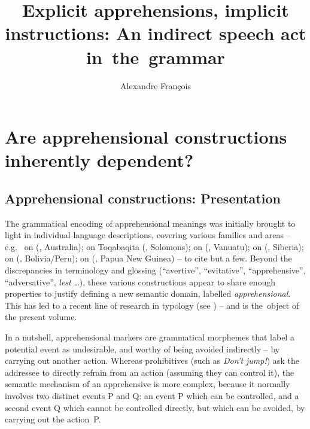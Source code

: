\documentclass[output=paper,colorlinks,citecolor=brown]{langscibook}
\author{Alexandre François\affiliation{LaTTiCe, CNRS‒ENS-PSL, USN\\Australian National University}}
\title{Explicit apprehensions, implicit instructions: An indirect speech act in~the~grammar}
\begin{document}
\maketitle


\section{Are apprehensional constructions inherently dependent?}
\label{sec:1}

\subsection{Apprehensional constructions: Presentation}
\label{subsec:acpresentation}

The grammatical encoding of apprehensional meanings was initially brought to light in individual language descriptions, covering various families and areas -- e.g.\ \citet{Austin1981} on  (, Australia); \citet{lichtenberk1995} on Toqa\-ba\-qita (, Solomons); \citet{francois2003} on  (, Vanuatu); \citet{pakendorfschalley2007} on  (, Siberia); \citet{vuillermet2018a} on  (, Bolivia/Peru); \citet{smithdennis2021} on  (, Papua New Guinea) -- to cite but a few. Beyond the discrepancies in terminology and glossing (``avertive'', ``evitative'', ``apprehensive'', ``adversative'', \textit{lest}  {\ldots}), these various constructions appear to share enough properties to justify defining a new semantic domain, label\-led \textit{apprehensional}. This has led to a recent line of research in typology (see \citealt{Dobrushina2006,  vuillermet2018b, vuillermet2018a, fallerschultzeberndt2018}) -- and is the~object of the present volume.


In a nutshell, apprehensional markers are grammatical morphemes that label a potential event as undesirable, and worthy of being avoided indirectly -- by carrying out another action. Whereas prohibitives (such as \textit{Don't jump!}) ask the addressee to directly refrain from an action (assuming they can control it), the semantic mechanism of an apprehensive is more complex, because it normally involves two distinct events P and Q: an event P which can be controlled, and a second event Q which cannot be controlled directly, but which can be avoided, by carrying out the action~P.
\end{document}
